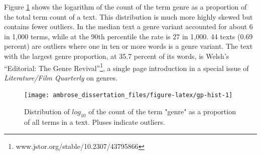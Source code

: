 \documentclass[]{book}
\let\rmarkdownfootnote\footnote%
\def\footnote{\protect\rmarkdownfootnote}
\theoremstyle{definition}
\theoremstyle{definition}
\theoremstyle{definition}
\theoremstyle{remark}
\begin{document}
Figure \ref{fig:gp-hist} shows the logarithm of the count of the term
genre as a proportion of the total term count of a text. This
distribution is much more highly skewed but contains fewer outliers. In
the median text a genre variant accounted for about 6 in 1,000 terms,
while at the 90th percentile the rate is 27 in 1,000. 44 texts (0.69
percent) are outliers where one in ten or more words is a genre variant.
The text with the largest genre proportion, at 35.7 percent of its
words, is Welsh's ``Editorial: The Genre Revival''\footnote{www.jstor.org/stable/10.2307/43795866},
a single page introduction in a special issue of \emph{Literature/Film
Quarterly} on genres.

\begin{figure}

{\centering \texttt{[image: ambrose\_dissertation\_files/figure-latex/gp-hist-1]} 

}

\caption{Distribution of $log_{10}$ of the count of the term "genre" as a proportion of all terms in a text. Pluses indicate outliers.}\label{fig:gp-hist}
\end{figure}
\end{document}
